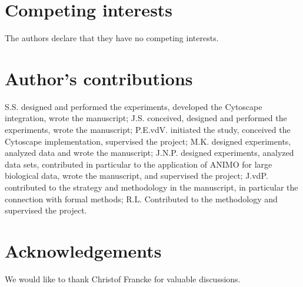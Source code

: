 \documentclass{bmcart}
\begin{document}
\begin{backmatter}

\section*{Competing interests}
The authors declare that they have no competing interests.

\section*{Author's contributions}
S.S. designed and performed the experiments, developed the Cytoscape integration, wrote the manuscript;
J.S. conceived, designed and performed the experiments, wrote the manuscript;
P.E.vdV. initiated the study, conceived the Cytoscape implementation, supervised the project;
M.K. designed experiments, analyzed data and wrote the manuscript;
J.N.P. designed experiments, analyzed data sets, contributed in particular to the application of ANIMO for large biological data, wrote the manuscript, and supervised the project;
J.vdP. contributed to the strategy and methodology in the manuscript, in particular the connection with formal methods;
R.L. Contributed to the methodology and supervised the project.

\section*{Acknowledgements}
We would like to thank Christof Francke for valuable discussions.


\end{backmatter}
\end{document}
